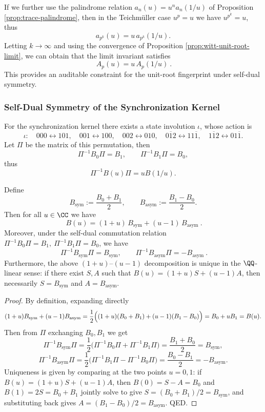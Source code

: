 \begin{remark}\label{rem:witt-unit-root-self-dual}
If we further use the palindrome relation \(a_n(u)=u^n a_n(1/u)\) of Proposition \ref{prop:trace-palindrome}, then in the Teichm\"uller case \(u^p=u\) we have \(u^{p^k}=u\), thus
\[
a_{p^k}(u)=u\,a_{p^k}(1/u).
\]
Letting \(k\to\infty\) and using the convergence of Proposition \ref{prop:witt-unit-root-limit}, we can obtain that the limit invariant satisfies
\[
\boxed{\ A_p(u)=u\,A_p(1/u)\ }.
\]
This provides an auditable constraint for the unit-root fingerprint under self-dual symmetry.
\end{remark}

\subsubsection{Self-Dual Symmetry of the Synchronization Kernel}\label{app:kernel-self-dual}
For the synchronization kernel there exists a state involution $\iota$, whose action is
\[
\iota:\quad
000\leftrightarrow 101,\quad
001\leftrightarrow 100,\quad
002\leftrightarrow 010,\quad
0\overline{1}2\leftrightarrow 11\overline{1},\quad
1\overline{1}2\leftrightarrow 01\overline{1}.
\]
Let $\Pi$ be the matrix of this permutation, then
\[
\Pi^{-1}B_0\Pi=B_1,\qquad \Pi^{-1}B_1\Pi=B_0,
\]
thus
\[
\Pi^{-1}B(u)\Pi=uB(1/u).
\]
\begin{lemma}\label{lem:sync-kernel-even-odd-splitting}
Define
\[
B_{\mathrm{sym}}:=\frac{B_0+B_1}{2},\qquad
B_{\mathrm{asym}}:=\frac{B_1-B_0}{2}.
\]
Then for all \(u\in\CC\) we have
\[
\boxed{\ B(u)=(1+u)\,B_{\mathrm{sym}}+(u-1)\,B_{\mathrm{asym}}\ }.
\]
Moreover, under the self-dual commutation relation \(\Pi^{-1}B_0\Pi=B_1,\ \Pi^{-1}B_1\Pi=B_0\), we have
\[
\boxed{\ \Pi^{-1}B_{\mathrm{sym}}\Pi=B_{\mathrm{sym}},\qquad
\Pi^{-1}B_{\mathrm{asym}}\Pi=-B_{\mathrm{asym}}\ }.
\]
Furthermore, the above \((1+u)\)--\((u-1)\) decomposition is unique in the \(\QQ\)-linear sense: if there exist \(S,A\) such that
\(
B(u)=(1+u)S+(u-1)A
\), then necessarily \(S=B_{\mathrm{sym}}\) and \(A=B_{\mathrm{asym}}\).
\end{lemma}

\begin{proof}
By definition, expanding directly
\[
(1+u)B_{\mathrm{sym}}+(u-1)B_{\mathrm{asym}}
=\frac12\Bigl((1+u)(B_0+B_1)+(u-1)(B_1-B_0)\Bigr)
=B_0+uB_1
=B(u).
\]
Then from \(\Pi\) exchanging \(B_0,B_1\) we get
\[
\Pi^{-1}B_{\mathrm{sym}}\Pi
=\frac{1}{2}\bigl(\Pi^{-1}B_0\Pi+\Pi^{-1}B_1\Pi\bigr)
=\frac{B_1+B_0}{2}
=B_{\mathrm{sym}},
\]
\[
\Pi^{-1}B_{\mathrm{asym}}\Pi
=\frac{1}{2}\bigl(\Pi^{-1}B_1\Pi-\Pi^{-1}B_0\Pi\bigr)
=\frac{B_0-B_1}{2}
=-B_{\mathrm{asym}}.
\]
Uniqueness is given by comparing at the two points \(u=0,1\): if \(B(u)=(1+u)S+(u-1)A\), then
\(
B(0)=S-A=B_0
\)
and
\(
B(1)=2S=B_0+B_1
\)
jointly solve to give \(S=(B_0+B_1)/2=B_{\mathrm{sym}}\), and substituting back gives \(A=(B_1-B_0)/2=B_{\mathrm{asym}}\).
QED.
\end{proof}

